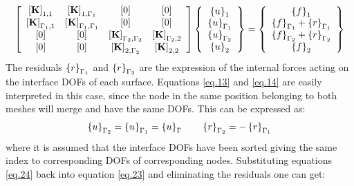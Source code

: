  \begin{equation}
 \label{eq.23}
     \left[ \begin{array}{cccc} 
     \left[{\mathbf{K}}\right]_{1,1} & \left[{\mathbf{K}}\right]_{1,\Gamma_1} & \left[{0}\right]& \left[{0}\right] \\
    \left[{\mathbf{K}}\right]_{\Gamma_1,1} & \left[{\mathbf{K}}\right]_{\Gamma_1,\Gamma_1} & \left[{0}\right]& \left[{0}\right]\\ \left[{0}\right]& \left[{0}\right]& \left[{\mathbf{K}}\right]_{\Gamma_2,\Gamma_2}&\left[{\mathbf{K}}\right]_{\Gamma_2,2}\\   
     \left[{0}\right] & \left[{0}\right]& \left[{\mathbf{K}}\right]_{2,\Gamma_2} & \left[{\mathbf{K}}\right]_{2,2}\end{array} \right] \left\lbrace \begin{array}{c} \left\lbrace{u}\right \rbrace_1\\\left\lbrace{u}\right \rbrace_{\Gamma_1}\\\left\lbrace{u}\right \rbrace_{\Gamma_2}\\\left\lbrace{u}\right \rbrace_2
     \end{array}\right\rbrace= \left\lbrace\begin{array}{c} \left\lbrace{f}\right \rbrace_1\\\left\lbrace{f}\right \rbrace_{\Gamma_1}+\left\lbrace{r}\right \rbrace_{\Gamma_1}\\\left\lbrace{f}\right \rbrace_{\Gamma_2}+\left\lbrace{r}\right \rbrace_{\Gamma_2}\\\left\lbrace{f}\right \rbrace_2
     \end{array}\right\rbrace
 \end{equation}
 The residuals $\left\lbrace{r}\right \rbrace_{\Gamma_1}$ and $\left\lbrace{r}\right \rbrace_{\Gamma_2}$ are the expression of the internal forces acting on the interface DOFs of each surface. Equations \eqref{eq.13} and \eqref{eq.14} are easily interpreted in this case, since the node in the same position belonging to both meshes will merge and have the same DOFs.
 This can be expressed as:
 \begin{eqnarray}
 \label{eq.24}
 \left\lbrace{u}\right \rbrace_{\Gamma_2}=\left\lbrace{u}\right \rbrace_{\Gamma_1} =\left\lbrace{u}\right \rbrace_{\Gamma} \qquad
 \label{eq.25}
 \left\lbrace{r}\right \rbrace_{\Gamma_2}=-\left\lbrace{r}\right \rbrace_{\Gamma_1}
 \end{eqnarray}
 where it is assumed that the interface DOFs have been sorted giving the same index to corresponding DOFs of corresponding nodes. Substituting equations \eqref{eq.24} back into equation \eqref{eq.23} and eliminating the residuals one can get:
